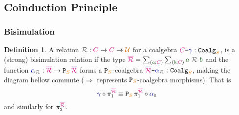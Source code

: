 \documentclass[xelatex,mathserif,serif,notheorems]{beamer} %
\theoremstyle{plain} %
\theoremstyle{definition}
\newtheorem{defn}[thm]{Definition}%
\theoremstyle{remark}
\newcommand*{\term}[1]{\textcolor{green!30!black}{#1}} %
\newcommand*{\type}[1]{\textcolor{magenta!90!black}{#1}}
\newcommand*{\container}[1]{\textcolor{orange}{#1}}
\newcommand*{\universe}[1]{\textcolor{orange!80!black}{#1}}
\newcommand*{\coalg}[2]{#1\texttt{-}#2}
\newcommand*{\relation}[1]{\textcolor{gray!75!black}{\ensuremath{\mathtt{#1}}}}
\newcommand*{\function}[1]{\textcolor{blue!60!black}{\ensuremath{\mathtt{#1}}}}
\newcommand*{\typeformer}[1]{\ensuremath{\mathtt{#1}}}
\newcommand*{\functor}[1]{\ensuremath{\mathbf{\mathtt{#1}}}}
\newcommand{\setlengths}{
  \setlength{\abovedisplayskip}{4pt}
  \setlength{\belowdisplayskip}{4pt}
  \setlength{\abovedisplayshortskip}{2pt}
  \setlength{\belowdisplayshortskip}{2pt}
}
\begin{document}
\subsection{Coinduction Principle}
\begin{frame}[fragile]
  \frametitle{Bisimulation}
  \begin{defn}\setlengths
    A relation \(\relation{\mathcal{R}} : \type{C} \rightarrow \type{C} \rightarrow \universe{\mathcal{U}}\) for a coalgebra \(\coalg{\type{C}}{\function{\gamma}} : \typeformer{Coalg}_{\container{S}}\), is a (strong) bisimulation relation if the type \(\type{\overline{\mathcal{R}}} = \sum_{(\term{a} : \type{C})} \sum_{(\term{b} : \type{C})} \term{a}~\relation{\mathcal{R}}~\term{b}\) and the function \(\function{\alpha}_{\relation{\mathcal{R}}} : \type{\overline{\mathcal{R}}} \rightarrow \functor{P}_{\container{S}}\,\type{\overline{\mathcal{R}}}\) forms a \(\functor{P}_{\container{S}}\)-coalgebra \(\coalg{\type{\overline{\mathcal{R}}}}{\function{\alpha}_{\relation{\mathcal{R}}}} : \mathtt{Coalg}_{\container{S}}\), making the diagram bellow commute (\(\Longrightarrow\) represents \(\functor{P}_{\container{S}}\)-coalgebra morphisms). That is
    \begin{equation}
      \function{\gamma} \circ \pi_1^{\type{\overline{\mathcal{R}}}} \equiv \functor{P}_{\container{S}}\,\pi_1^{\type{\overline{\mathcal{R}}}} \circ \function{\alpha}_{\relation{R}}
    \end{equation}
    and similarly for \(\pi_2^{\type{\overline{\mathcal{R}}}}\).
  \end{defn}
  \begin{figure}[h]
    \centering
  \end{figure}
\end{frame}
\end{document}
